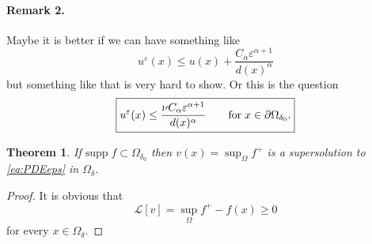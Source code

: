 \documentclass[10pt]{article}
\theoremstyle{plain}
\newtheorem{thm}{Theorem}
\theoremstyle{remark}
\begin{document}
\paragraph{Remark 2.} Maybe it is better if we can have something like
\begin{equation*}
    u^\varepsilon(x)\leq u(x)+\frac{C_\alpha \varepsilon^{\alpha+1}}{d(x)^\alpha}
\end{equation*}
but something like that is very hard to show. Or this is the question
\begin{equation*}
    \fbox{$\displaystyle u^\varepsilon(x) \leq \frac{\nu C_\alpha \varepsilon^{\alpha+1}}{d(x)^\alpha} \qquad\text{for}\; x\in \partial \Omega_{\delta_0}.$}
\end{equation*}


\begin{thm}\label{thm:super_int} If $\mathrm{supp}\;f\subset \Omega_{\delta_0}$ then $v(x) = \sup_{\Omega}f^+$ is a supersolution to \eqref{eq:PDEeps} in $\Omega_{\delta}$.
\end{thm}
\begin{proof} It is obvious that
\begin{equation*}
    \mathcal{L}[v] = \sup_{\Omega} f^+  - f(x) \geq 0 
\end{equation*}
for every $x\in \Omega_\delta$.
\end{proof}
\end{document}
